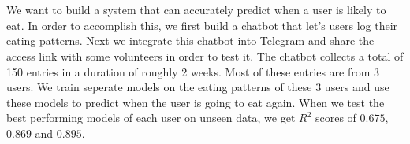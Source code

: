 \chapter{\abstractname}
We want to build a system that can accurately predict when a user is likely to eat. 
In order to accomplish this, we first build a chatbot that let's users log their eating patterns.
Next we integrate this chatbot into Telegram and share the access link with some volunteers in order to test it.
The chatbot collects a total of 150 entries in a duration of roughly 2 weeks.
Most of these entries are from 3 users.
We train seperate models on the eating patterns of these 3 users
and use these models to predict when the user is going to eat again.
When we test the best performing models of each user on unseen data,
we get $R^2$ scores of $0.675$, $0.869$ and $0.895$.



